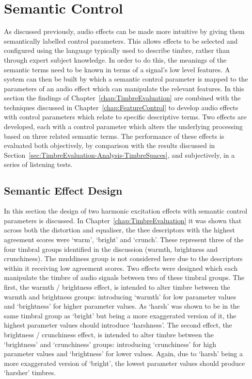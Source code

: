 \section{Semantic Control}
\label{sec:PerceptualExperiments-SemanticControl}
	As discussed previously, audio effects can be made more intuitive by giving them semantically labelled control
	parameters. This allows effects to be selected and configured using the language typically used to describe timbre,
	rather than through expert subject knowledge. In order to do this, the meanings of the semantic terms need to be
	known in terms of a signal's low level features. A system can then be built by which a semantic control parameter
	is mapped to the parameters of an audio effect which can manipulate the relevant features. In this section the
	findings of Chapter~\ref{chap:TimbreEvaluation} are combined with the techniques discussed in
	Chapter~\ref{chap:FeatureControl} to develop audio effects with control parameters which relate to specific
	descriptive terms. Two effects are developed, each with a control parameter which alters the underlying processing
	based on three related semantic terms. The performance of these effects is evaluated both objectively, by
	comparison with the results discussed in Section~\ref{sec:TimbreEvaluation-Analysis-TimbreSpaces}, and
	subjectively, in a series of listening tests.

	\subsection{Semantic Effect Design}
	\label{sec:PerceptualExperiments-SemanticControl-EffectDesign}
		In this section the design of two harmonic excitation effects with semantic control parameters is
		discussed. In Chapter~\ref{chap:TimbreEvaluation} it was shown that across both the distortion and
		equaliser, the thee descriptors with the highest agreement scores were `warm', `bright' and `crunch'. These
		represent three of the four timbral groups identified in the discussion (warmth, brightness and
		crunchiness). The muddiness group is not considered here due to the descriptors within it receiving low
		agreement scores. Two effects were designed which each manipulate the timbre of audio signals between two
		of these timbral groups. The first, the warmth / brightness effect, is intended to alter timbre between the
		warmth and brightness groups: introducing `warmth' for low parameter values and `brightness' for higher
		parameter values. As `harsh' was shown to be in the same timbral group as `bright' but being a more
		exaggerated version of it, the highest parameter values should introduce `harshness'. The second effect,
		the brightness / crunchiness effect, is intended to alter timbre between the `brightness' and `crunchiness'
		groups: introducing `crunchiness' for high parameter values and `brightness' for lower values. Again, due
		to `harsh' being a more exaggerated version of `bright', the lowest parameter values should produce
		`harsher' timbres.

